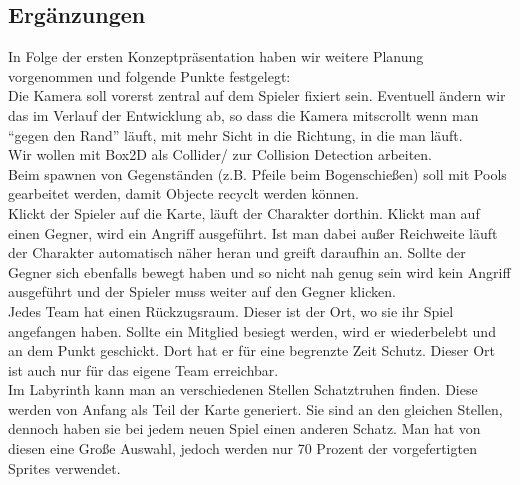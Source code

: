 \documentclass[10pt,a4paper,notitlepage]{report}
\begin{document}
\begin{flushleft}
\chapter{Ergänzungen}
In Folge der ersten Konzeptpräsentation haben wir weitere Planung vorgenommen und folgende Punkte festgelegt:\\
Die Kamera soll vorerst zentral auf dem Spieler fixiert sein. Eventuell ändern wir das im Verlauf der Entwicklung ab, so dass die Kamera mitscrollt wenn man \enquote{gegen den Rand} läuft, mit mehr Sicht in die Richtung, in die man läuft.\\
Wir wollen mit Box2D als Collider/ zur Collision Detection arbeiten.\\
Beim spawnen von Gegenständen (z.B. Pfeile beim Bogenschießen) soll mit Pools gearbeitet werden, damit Objecte recyclt werden können.\\
Klickt der Spieler auf die Karte, läuft der Charakter dorthin. Klickt man auf einen Gegner, wird ein Angriff ausgeführt. Ist man dabei außer Reichweite läuft der Charakter automatisch näher heran und greift daraufhin an. Sollte der Gegner sich ebenfalls bewegt haben und so nicht nah genug sein wird kein Angriff ausgeführt und der Spieler muss weiter auf den Gegner klicken.\\
Jedes Team hat einen Rückzugsraum. Dieser ist der Ort, wo sie ihr Spiel angefangen haben. Sollte ein Mitglied besiegt werden, wird er wiederbelebt und an dem Punkt geschickt. Dort hat er für eine begrenzte Zeit Schutz. Dieser Ort ist auch nur für das eigene Team erreichbar.\\
Im Labyrinth kann man an verschiedenen Stellen Schatztruhen finden. Diese werden von Anfang als Teil der Karte generiert. Sie sind an den gleichen Stellen, dennoch haben sie bei jedem neuen Spiel einen anderen Schatz. Man hat von diesen eine Große Auswahl, jedoch werden nur 70 Prozent der vorgefertigten Sprites verwendet.\\



\end{flushleft}
\end{document}

